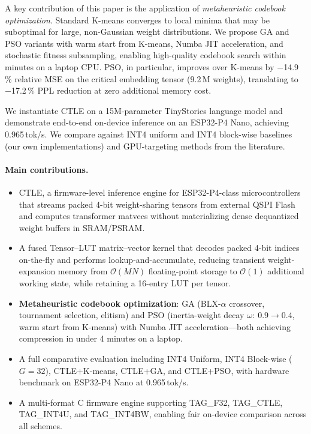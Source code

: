 \documentclass[lettersize,journal]{IEEEtran}
\begin{document}
A key contribution of this paper is the application of \emph{metaheuristic
codebook optimization}. Standard K-means converges to local minima that
may be suboptimal for large, non-Gaussian weight distributions.
We propose GA and PSO variants with warm start from K-means, Numba JIT
acceleration, and stochastic fitness subsampling, enabling high-quality
codebook search within minutes on a laptop CPU.
PSO, in particular, improves over K-means by $-$14.9\,\% relative MSE on
the critical embedding tensor (9.2\,M weights), translating to
$-$17.2\,\% PPL reduction at zero additional memory cost.

We instantiate CTLE on a 15M-parameter TinyStories language model and
demonstrate end-to-end on-device inference on an ESP32-P4 Nano, achieving
0.965\,tok/s. We compare against INT4 uniform and INT4 block-wise baselines
(our own implementations) and GPU-targeting methods from the literature.

\paragraph{Main contributions.}
\begin{itemize}
    \item CTLE, a firmware-level inference engine for ESP32-P4-class
    microcontrollers that streams packed 4-bit weight-sharing tensors from
    external QSPI Flash and computes transformer matvecs without materializing
    dense dequantized weight buffers in SRAM/PSRAM.

    \item A fused Tensor--LUT matrix--vector kernel that decodes packed 4-bit
    indices on-the-fly and performs lookup-and-accumulate, reducing transient
    weight-expansion memory from $\mathcal{O}(MN)$ floating-point storage to
    $\mathcal{O}(1)$ additional working state, while retaining a 16-entry LUT
    per tensor.

    \item \textbf{Metaheuristic codebook optimization}: GA (BLX-$\alpha$
    crossover, tournament selection, elitism) and PSO (inertia-weight decay
    $\omega{:}\ 0.9\!\to\!0.4$, warm start from K-means) with Numba JIT
    acceleration---both achieving compression in under 4 minutes on a laptop.

    \item A full comparative evaluation including INT4 Uniform, INT4 Block-wise
    ($G{=}32$), CTLE+K-means, CTLE+GA, and CTLE+PSO, with hardware
    benchmark on ESP32-P4 Nano at 0.965\,tok/s.

    \item A multi-format C firmware engine supporting TAG\_F32,
    TAG\_CTLE, TAG\_INT4U, and TAG\_INT4BW, enabling fair on-device
    comparison across all schemes.
\end{itemize}
\end{document}

